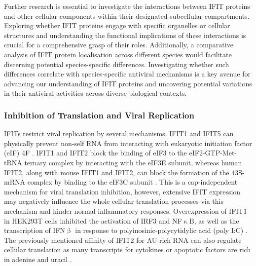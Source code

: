 Further research is essential to investigate the interactions between IFIT proteins and other cellular components within their designated subcellular compartments. Exploring whether IFIT proteins engage with specific organelles or cellular structures and understanding the functional implications of these interactions is crucial for a comprehensive grasp of their roles. Additionally, a comparative analysis of IFIT protein localisation across different species would facilitate discerning potential species-specific differences. Investigating whether such differences correlate with species-specific antiviral mechanisms is a key avenue for advancing our understanding of IFIT proteins and uncovering potential variations in their antiviral activities across diverse biological contexts.

\subsubsection{Inhibition of Translation and Viral Replication} \label{Inhibition of Translation and Viral Replication}
IFITs restrict viral replication by several mechanisms. IFIT1 and IFIT5 can physically prevent non-self RNA from interacting with eukaryotic initiation factor (eIF) 4F \cite{Kumar2014InhibitionMRNAs}. IFIT1 and IFIT2 block the binding of eIF3 to the eIF2-GTP-Met-tRNA ternary complex by interacting with the eIF3E subunit, whereas human IFIT2, along with mouse IFIT1 and IFIT2, can block the formation of the 43S-mRNA complex by binding to the eIF3C subunit \cite{Diamond2014IFIT1:Translation, Guo2000CharacterizationVirus}. This is a cap-independent mechanism for viral translation inhibition, however, extensive IFIT expression may negatively influence the whole cellular translation processes via this mechanism and hinder normal inflammatory responses. Overexpression of IFIT1 in HEK293T cells inhibited the activation of IRF3 and NF$\upkappa$B, as well as the transcription of IFN$\upbeta$ in response to polyinosinic-polycytidylic acid (poly I:C) \cite{Li2009ISG56Response}. The previously mentioned affinity of IFIT2 for AU-rich RNA can also regulate cellular translation as many transcripts for cytokines or apoptotic factors are rich in adenine and uracil \cite{Palanisamy2012ControlMicroRNAs}. 

